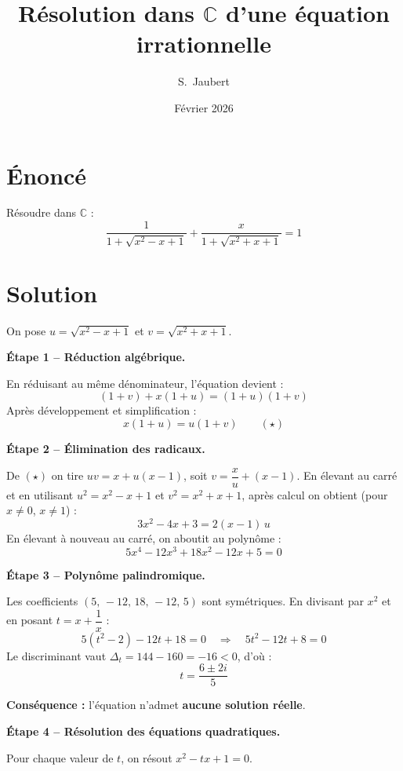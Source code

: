 \documentclass[a4paper,12pt]{article}
\title{R\'esolution dans $\mathbb{C}$ d'une \'equation irrationnelle}
\author{S.\ Jaubert}
\date{F\'evrier 2026}
\begin{document}
\maketitle

\section*{\'Enonc\'e}

R\'esoudre dans $\mathbb{C}$ :
\[
  \frac{1}{1+\sqrt{x^2-x+1}} + \frac{x}{1+\sqrt{x^2+x+1}} = 1
\]

\section*{Solution}

On pose $u = \sqrt{x^2-x+1}$ et $v = \sqrt{x^2+x+1}$.

\bigskip

\textbf{\'Etape 1 -- R\'eduction alg\'ebrique.}

En r\'eduisant au m\^eme d\'enominateur, l'\'equation devient :
\[
  (1+v) + x(1+u) = (1+u)(1+v)
\]
Apr\`es d\'eveloppement et simplification :
\[
  x(1+u) = u(1+v) \qquad (\star)
\]

\bigskip

\textbf{\'Etape 2 -- \'Elimination des radicaux.}

De $(\star)$ on tire $uv = x + u(x-1)$, soit $v = \dfrac{x}{u} + (x-1)$. En \'elevant au carr\'e et en utilisant $u^2 = x^2-x+1$ et $v^2 = x^2+x+1$, apr\`es calcul on obtient (pour $x \neq 0$, $x \neq 1$) :
\[
  3x^2 - 4x + 3 = 2(x-1)\,u
\]
En \'elevant \`a nouveau au carr\'e, on aboutit au polyn\^ome :
\[
  5x^4 - 12x^3 + 18x^2 - 12x + 5 = 0
\]

\bigskip

\textbf{\'Etape 3 -- Polyn\^ome palindromique.}

Les coefficients $(5,\, -12,\, 18,\, -12,\, 5)$ sont sym\'etriques. En divisant par $x^2$ et en posant $t = x + \dfrac{1}{x}$ :
\[
  5\!\left(t^2 - 2\right) - 12t + 18 = 0 \quad \Longrightarrow \quad 5t^2 - 12t + 8 = 0
\]
Le discriminant vaut $\Delta_t = 144 - 160 = -16 < 0$, d'o\`u :
\[
  t = \frac{6 \pm 2i}{5}
\]

\textbf{Cons\'equence :} l'\'equation n'admet \textbf{aucune solution r\'eelle}.

\bigskip

\textbf{\'Etape 4 -- R\'esolution des \'equations quadratiques.}

Pour chaque valeur de $t$, on r\'esout $x^2 - tx + 1 = 0$.
\end{document}
